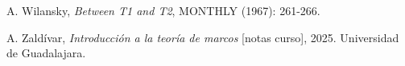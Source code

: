 \documentclass[compress,12pt]{beamer}
\begin{document}
\begin{frame}[allowframebreaks]
\begin{thebibliography}{20}


 A. Wilansky, \textit{Between T1 and T2}, MONTHLY (1967): 261-266.

 A. Zaldívar, \textit{Introducción a la teoría de marcos} [notas curso], 2025. Universidad de Guadalajara.
\end{thebibliography}
\end{frame}
\end{document}

